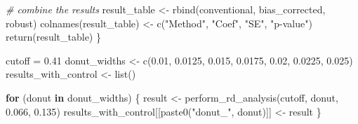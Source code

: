 \documentclass[
]{article}
\newenvironment{Shaded}{\begin{snugshade}}{\end{snugshade}}
\newcommand{\CommentTok}[1]{\textcolor[rgb]{0.56,0.35,0.01}{\textit{#1}}}
\newcommand{\ControlFlowTok}[1]{\textcolor[rgb]{0.13,0.29,0.53}{\textbf{#1}}}
\newcommand{\FloatTok}[1]{\textcolor[rgb]{0.00,0.00,0.81}{#1}}
\newcommand{\FunctionTok}[1]{\textcolor[rgb]{0.00,0.00,0.00}{#1}}
\newcommand{\NormalTok}[1]{#1}
\newcommand{\OtherTok}[1]{\textcolor[rgb]{0.56,0.35,0.01}{#1}}
\newcommand{\StringTok}[1]{\textcolor[rgb]{0.31,0.60,0.02}{#1}}
\begin{document}
\begin{Shaded}
\begin{Highlighting}[]
    \CommentTok{\# combine the results}
\NormalTok{    result\_table }\OtherTok{\textless{}{-}} \FunctionTok{rbind}\NormalTok{(conventional, bias\_corrected, robust)}
    \FunctionTok{colnames}\NormalTok{(result\_table) }\OtherTok{\textless{}{-}} \FunctionTok{c}\NormalTok{(}\StringTok{"Method"}\NormalTok{, }\StringTok{"Coef"}\NormalTok{, }\StringTok{"SE"}\NormalTok{, }\StringTok{"p{-}value"}\NormalTok{)}
    \FunctionTok{return}\NormalTok{(result\_table)}
\NormalTok{\}}

\NormalTok{cutoff }\OtherTok{=} \FloatTok{0.41}
\NormalTok{donut\_widths }\OtherTok{\textless{}{-}} \FunctionTok{c}\NormalTok{(}\FloatTok{0.01}\NormalTok{, }\FloatTok{0.0125}\NormalTok{, }\FloatTok{0.015}\NormalTok{, }\FloatTok{0.0175}\NormalTok{, }\FloatTok{0.02}\NormalTok{, }\FloatTok{0.0225}\NormalTok{, }\FloatTok{0.025}\NormalTok{)}
\NormalTok{results\_with\_control }\OtherTok{\textless{}{-}} \FunctionTok{list}\NormalTok{()}

\ControlFlowTok{for}\NormalTok{ (donut }\ControlFlowTok{in}\NormalTok{ donut\_widths) \{}
\NormalTok{    result }\OtherTok{\textless{}{-}} \FunctionTok{perform\_rd\_analysis}\NormalTok{(cutoff, donut, }\FloatTok{0.066}\NormalTok{, }\FloatTok{0.135}\NormalTok{)}
\NormalTok{    results\_with\_control[[}\FunctionTok{paste0}\NormalTok{(}\StringTok{"donut\_"}\NormalTok{, donut)]] }\OtherTok{\textless{}{-}}\NormalTok{ result}
\NormalTok{\}}
\end{Highlighting}
\end{Shaded}
\end{document}
